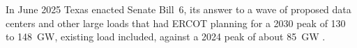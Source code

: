 In June 2025 Texas enacted Senate Bill~6, its answer to a wave of proposed data centers and other large loads that had ERCOT planning for a 2030 peak of 130 to 148~GW, existing load included, against a 2024 peak of about 85~GW \autocite{texas2025sb6,texassrc2025sb6,ercot2025ltlf}. %
